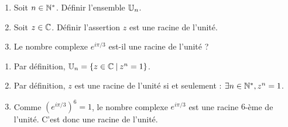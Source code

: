 \begin{exo}

\begin{enumerate}
\item Soit $n\in \mathbb{N}^*$. Définir l'ensemble $\mathbb{U}_n$.
\item Soit $z\in \mathbb{C}$. Définir l'assertion \og $z$ est une racine de l'unité.\fg
\item Le nombre complexe $e^{i\pi/3}$ est-il une racine de l'unité ?
\end{enumerate}
\begin{sol}
\begin{enumerate}
\item Par définition, $\mathbb{U}_n=\left\{z\in\mathbb{C}\:\middle|\:z^n=1 \right\}$.
\item Par définition, $z$ est une racine de l'unité si et seulement : $\exists n\in\mathbb{N}^*, z^n=1$.
\item Comme $\left(e^{i\pi/3}\right)^6 = 1$, le nombre complexe $e^{i\pi/3}$ est une racine $6$-ème de l'unité. C'est donc une racine de l'unité.
\end{enumerate}
\end{sol}
\end{exo}


